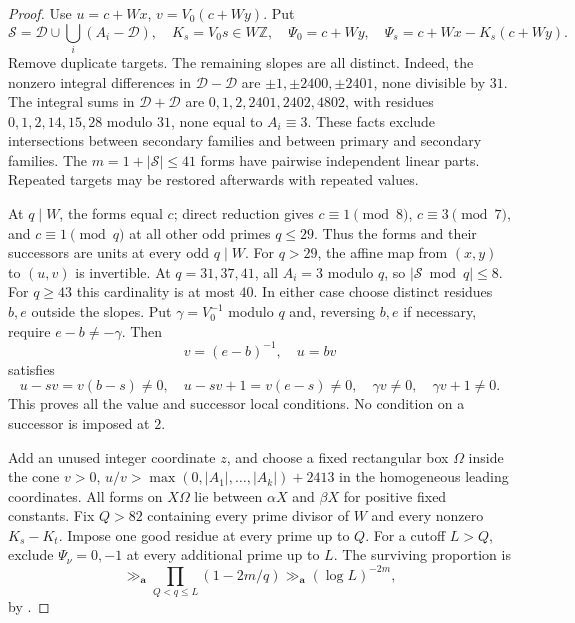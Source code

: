 \documentclass[11pt]{article}
\theoremstyle{definition}
\theoremstyle{remark}
\begin{document}
\begin{proof}
Use $u=c+Wx$, $v=V_0(c+Wy)$. Put
\[
 \mathcal S=\mathcal D\cup\bigcup_i(A_i-\mathcal D),\quad
 K_s=V_0s\in W\mathbb Z,
 \quad\Psi_0=c+Wy,\quad\Psi_s=c+Wx-K_s(c+Wy).
\]
Remove duplicate targets. The remaining slopes are all distinct.
Indeed, the nonzero integral differences in $\mathcal D-\mathcal D$
are $\pm1,\pm2400,\pm2401$, none divisible by $31$.
The integral sums in $\mathcal D+\mathcal D$ are
$0,1,2,2401,2402,4802$, with residues $0,1,2,14,15,28$ modulo $31$,
none equal to $A_i\equiv3$. These facts exclude intersections between
secondary families and between primary and secondary families.
The $m=1+|\mathcal S|\le41$ forms have pairwise independent linear
parts. Repeated targets may be restored afterwards with repeated values.

At $q\mid W$, the forms equal $c$; direct reduction gives
$c\equiv1\pmod8$, $c\equiv3\pmod7$, and $c\equiv1\pmod q$ at
all other odd primes $q\le29$. Thus the forms and their successors
are units at every odd $q\mid W$. For $q>29$, the affine map from
$(x,y)$ to $(u,v)$ is invertible. At $q=31,37,41$, all $A_i=3$
modulo $q$, so $|\mathcal S\bmod q|\le8$. For $q\ge43$ this
cardinality is at most $40$. In either case choose distinct residues
$b,e$ outside the slopes. Put $\gamma=V_0^{-1}$ modulo $q$ and,
reversing $b,e$ if necessary, require $e-b\ne-\gamma$. Then
\[
 v=(e-b)^{-1},\quad u=bv
\]
satisfies
\[
 u-sv=v(b-s)\ne0,\quad u-sv+1=v(e-s)\ne0,
 \quad\gamma v\ne0,\quad\gamma v+1\ne0.
\]
This proves all the value and successor local conditions. No condition
on a successor is imposed at $2$.

Add an unused integer coordinate $z$, and choose a fixed rectangular
box $\Omega$ inside the cone $v>0$, $u/v>\max(0,|A_1|,\ldots,|A_k|)+2413$ in the
homogeneous leading coordinates. All forms on $X\Omega$ lie between
$\alpha X$ and $\beta X$ for positive fixed constants. Fix $Q>82$
containing every prime divisor of $W$ and every nonzero $K_s-K_t$.
Impose one good residue at every prime up to $Q$. For a cutoff $L>Q$,
exclude $\Psi_\nu=0,-1$ at every additional prime up to $L$.
The surviving proportion is
\[
 \gg_{\mathbf a}\prod_{Q<q\le L}(1-2m/q)
 \gg_{\mathbf a}(\log L)^{-2m},
\]
by \cite[Theorem~1, modulus~2]{williams-mertens}.


\end{proof}
\end{document}
